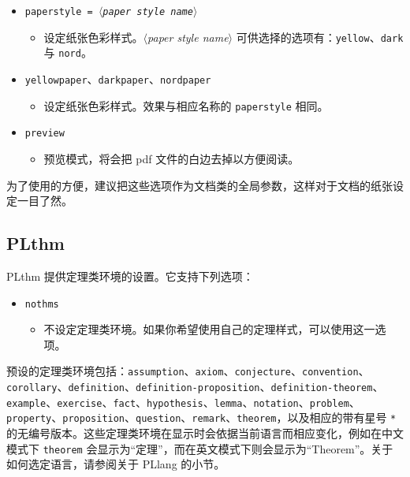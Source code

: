 \documentclass[allowbf]{lebhart}
\providecommand{\meta}[1]{$\langle${\normalfont\itshape#1}$\rangle$}
\providecommand{\PLlang}{\textsf{PLlang}}
\providecommand{\PLthm}{\textsf{PLthm}}
\begin{document}
\begin{itemize}
    \item \texttt{paperstyle = \meta{paper style name}}
        \begin{itemize}
            \item 设定纸张色彩样式。\meta{paper style name} 可供选择的选项有：\texttt{yellow}、\texttt{dark} 与 \texttt{nord}。
        \end{itemize}
    \item \texttt{yellowpaper}、\texttt{darkpaper}、\texttt{nordpaper}
        \begin{itemize}
            \item 设定纸张色彩样式。效果与相应名称的 \texttt{paperstyle} 相同。
        \end{itemize}
    \item \texttt{preview}
        \begin{itemize}
            \item 预览模式，将会把 pdf 文件的白边去掉以方便阅读。
        \end{itemize}
\end{itemize}

为了使用的方便，建议把这些选项作为文档类的全局参数，这样对于文档的纸张设定一目了然。

\subsection{PLthm}

\PLthm{} 提供定理类环境的设置。它支持下列选项：
\begin{itemize}
    \item \texttt{nothms}
    \begin{itemize}
        \item 不设定定理类环境。如果你希望使用自己的定理样式，可以使用这一选项。
    \end{itemize}
\end{itemize}

预设的定理类环境包括：\texttt{assumption}、\texttt{axiom}、\texttt{conjecture}、\texttt{convention}、\texttt{corollary}、\texttt{definition}、\texttt{definition-proposition}、\texttt{definition-theorem}、\texttt{example}、\texttt{exercise}、\texttt{fact}、\texttt{hypothesis}、\texttt{lemma}、\texttt{notation}、\texttt{problem}、\texttt{property}、\texttt{proposition}、\texttt{question}、\texttt{remark}、\texttt{theorem}，以及相应的带有星号 \lstinline|*| 的无编号版本。这些定理类环境在显示时会依据当前语言而相应变化，例如在中文模式下 \texttt{theorem} 会显示为“定理”，而在英文模式下则会显示为“Theorem”。关于如何选定语言，请参阅关于 \PLlang{} 的小节。
\end{document}

